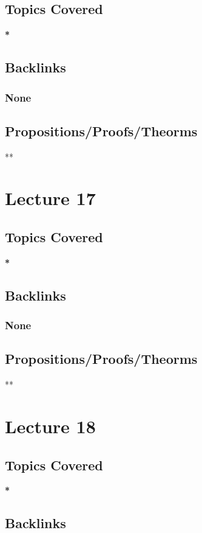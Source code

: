 \documentclass[11pt]{article}
\begin{document}
\subsection*{Topics Covered}
\label{sec:org05f7c55}
\textbf{*}
\subsection*{Backlinks}
\label{sec:org93c1788}
\subsubsection*{None}
\label{sec:org9e6000d}
\subsection*{Propositions/Proofs/Theorms}
\label{sec:org13f6096}
**

\section*{Lecture 17}
\label{sec:org2afea9b}
\subsection*{Topics Covered}
\label{sec:org089f983}
\textbf{*}
\subsection*{Backlinks}
\label{sec:orgfe06916}
\subsubsection*{None}
\label{sec:org74ecaa4}
\subsection*{Propositions/Proofs/Theorms}
\label{sec:org31222cd}
**

\section*{Lecture 18}
\label{sec:orgdc3217d}
\subsection*{Topics Covered}
\label{sec:orgceec16d}
\textbf{*}
\subsection*{Backlinks}
\label{sec:org187faf5}
\end{document}
